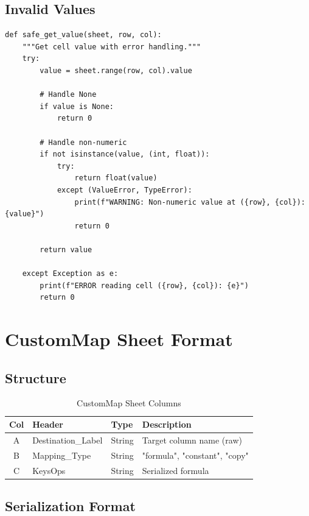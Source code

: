 \subsection{Invalid Values}

\begin{lstlisting}[style=pythonstyle]
def safe_get_value(sheet, row, col):
    """Get cell value with error handling."""
    try:
        value = sheet.range(row, col).value
        
        # Handle None
        if value is None:
            return 0
        
        # Handle non-numeric
        if not isinstance(value, (int, float)):
            try:
                return float(value)
            except (ValueError, TypeError):
                print(f"WARNING: Non-numeric value at ({row}, {col}): {value}")
                return 0
        
        return value
    
    except Exception as e:
        print(f"ERROR reading cell ({row}, {col}): {e}")
        return 0
\end{lstlisting}

\section{CustomMap Sheet Format}

\subsection{Structure}

\begin{table}[H]
\centering
\footnotesize
\begin{tabularx}{\textwidth}{cllX}
\toprule
\textbf{Col} & \textbf{Header} & \textbf{Type} & \textbf{Description} \\
\midrule
A & Destination\_Label & String & Target column name (raw) \\
B & Mapping\_Type & String & "formula", "constant", "copy" \\
C & KeysOps & String & Serialized formula \\
\bottomrule
\end{tabularx}
\caption{CustomMap Sheet Columns}
\end{table}

\subsection{Serialization Format}

